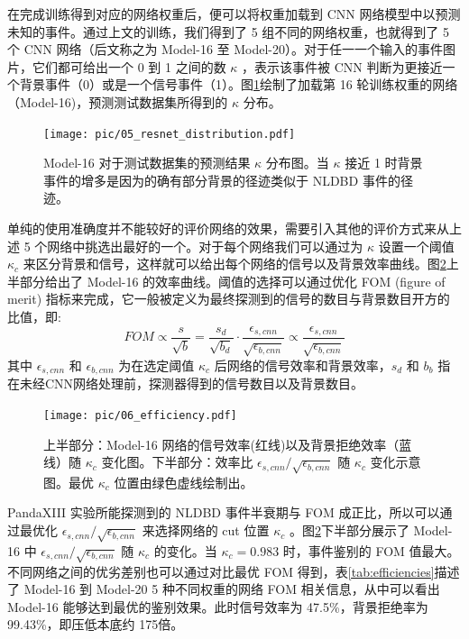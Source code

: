 在完成训练得到对应的网络权重后，便可以将权重加载到 CNN 网络模型中以预测未知的事件。通过上文的训练，我们得到了 5 组不同的网络权重，也就得到了 5 个 CNN 网络（后文称之为 Model-16 至 Model-20）。对于任一一个输入的事件图片，它们都可给出一个 0 到 1 之间的数 $\kappa$ ，表示该事件被 CNN 判断为更接近一个背景事件（0）或是一个信号事件（1）。图\ref{fig:cnn_dis}绘制了加载第 16 轮训练权重的网络（Model-16)，预测测试数据集所得到的 $\kappa$ 分布。

\begin{figure}
    \centering
    \texttt{[image: pic/05\_resnet\_distribution.pdf]}
    \caption{Model-16 对于测试数据集的预测结果 $\kappa$ 分布图。当 $\kappa$ 接近 1 时背景事件的增多是因为的确有部分背景的径迹类似于 NLDBD 事件的径迹。}
    \label{fig:cnn_dis}
\end{figure}

单纯的使用准确度并不能较好的评价网络的效果，需要引入其他的评价方式来从上述 5 个网络中挑选出最好的一个。对于每个网络我们可以通过为 $\kappa$ 设置一个阈值 $\kappa_c$ 来区分背景和信号，这样就可以给出每个网络的信号以及背景效率曲线。图\ref{fig:cnn_eff}上半部分给出了 Model-16 的效率曲线。阈值的选择可以通过优化 FOM (figure of merit) 指标来完成，它一般被定义为最终探测到的信号的数目与背景数目开方的比值，即:
\begin{equation}
    FOM \propto \frac{s}{\sqrt{b}}=\frac{s_d}{\sqrt{b_d}}\cdot \frac{\epsilon_{s,cnn}}{\sqrt{\epsilon_{b,cnn}}}\propto \frac{\epsilon_{s,cnn}}{\sqrt{\epsilon_{b,cnn}}}
\end{equation}
其中 $\epsilon_{s,cnn}$ 和 $\epsilon_{b,cnn}$ 为在选定阈值 $\kappa_c$ 后网络的信号效率和背景效率，$s_d$ 和 $b_b$ 指在未经CNN网络处理前，探测器得到的信号数目以及背景数目。

\begin{figure}
    \centering
    \texttt{[image: pic/06\_efficiency.pdf]}
    \caption{上半部分：Model-16 网络的信号效率(红线)以及背景拒绝效率（蓝线）随 $\kappa_c$ 变化图。下半部分：效率比 $\epsilon_{s,cnn}/\sqrt{\epsilon_{b,cnn}}$ 随 $\kappa_c$ 变化示意图。最优 $\kappa_c$ 位置由绿色虚线绘制出。}
    \label{fig:cnn_eff}
\end{figure}

PandaXIII 实验所能探测到的 NLDBD 事件半衰期与 FOM 成正比，所以可以通过最优化 $\epsilon_{s,cnn}/\sqrt{\epsilon_{b,cnn}}$ 来选择网络的 cut 位置 $\kappa_c$ 。图\ref{fig:cnn_eff}下半部分展示了 Model-16 中 $\epsilon_{s,cnn}/\sqrt{\epsilon_{b,cnn}}$ 随 $\kappa_c$ 的变化。当 $\kappa_c = 0.983$ 时，事件鉴别的 FOM 值最大。不同网络之间的优劣差别也可以通过对比最优 FOM 得到，表\ref{tab:efficiencies}描述了 Model-16 到 Model-20 5 种不同权重的网络 FOM 相关信息，从中可以看出 Model-16 能够达到最优的鉴别效果。此时信号效率为 47.5\%，背景拒绝率为 99.43\%，即压低本底约 175倍。


